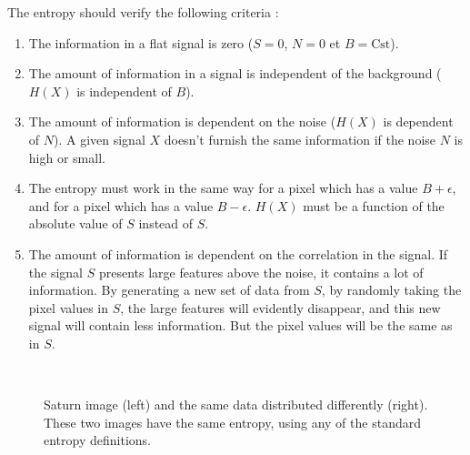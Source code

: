 The entropy should verify the following criteria \cite{starck:sta98_2}:
{\bf
\begin{enumerate}
\item The information in a flat signal is zero ($S=0$, $N=0$ et $B=\mathrm{Cst}$). 
\item The amount of information in a signal is independent of the background
($H(X)$ is independent of $B$).
\item The amount of information is dependent on the noise 
($H(X)$ is dependent of $N$). 
A given signal $X$ doesn't furnish the  same information if 
the noise $N$ is high or small.
\item The entropy must work in the same way for a pixel which
has a value $B + \epsilon$, and
for a pixel which has a value $B - \epsilon$.
$H(X)$ must be a function of the absolute value of $S$ instead of $S$.
\item The amount of information is dependent on the correlation in the signal.
If the signal $S$  presents large features above the noise, it contains
a lot of information. By generating a new set of  data from $S$, by 
randomly taking the pixel values in $S$, the large features will
evidently disappear, and this new signal will contain less information.
But the pixel values will be the same as in $S$.
\end{enumerate}
}
\begin{figure}[h]
\centerline{
\vbox{
\hbox{
}
}}
\caption{Saturn image (left) and the same data distributed differently (right). 
These
two images have the same entropy, using any of the standard entropy 
definitions.}
\label{fig_saturn}
\end{figure}
 
